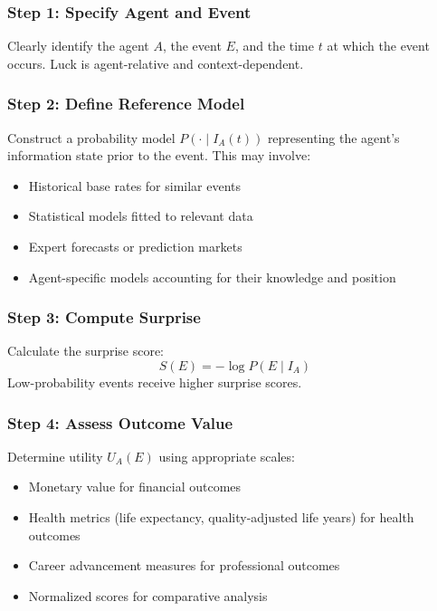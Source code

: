 \subsubsection{Step 1: Specify Agent and Event}

Clearly identify the agent $A$, the event $E$, and the time $t$ at which
the event occurs. Luck is agent-relative and context-dependent.

\subsubsection{Step 2: Define Reference Model}

Construct a probability model $P(\cdot \mid I_{A}(t))$ representing the agent's
information state prior to the event. This may involve:
\begin{itemize}
  \item Historical base rates for similar events

  \item Statistical models fitted to relevant data

  \item Expert forecasts or prediction markets

  \item Agent-specific models accounting for their knowledge and position
\end{itemize}

\subsubsection{Step 3: Compute Surprise}

Calculate the surprise score:
\begin{equation}
  S(E) = -\log P(E \mid I_{A})
\end{equation}
Low-probability events receive higher surprise scores.

\subsubsection{Step 4: Assess Outcome Value}

Determine utility $U_{A}(E)$ using appropriate scales:
\begin{itemize}
  \item Monetary value for financial outcomes

  \item Health metrics (life expectancy, quality-adjusted life years)
    for health outcomes

  \item Career advancement measures for professional outcomes

  \item Normalized scores for comparative analysis
\end{itemize}

